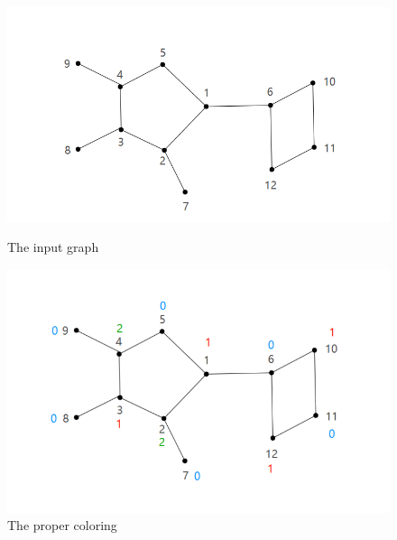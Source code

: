 \begin{figure}[htbp]
\centering
\begin{minipage}[t]{0.48\textwidth}
\centering
\includegraphics[width=1\textwidth]{figure/input.png}
\caption{\footnotesize The input graph}
\end{minipage}
\begin{minipage}[t]{0.48\textwidth}
\centering
\includegraphics[width=1\textwidth]{figure/propercoloring.png}
\caption{\footnotesize The proper coloring}
\end{minipage}
\end{figure}

